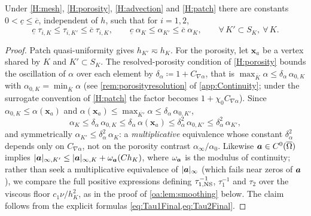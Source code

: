 \begin{lemma}
\label{oa:lem:patch}
Under \cref{H:mesh}, \cref{H:porosity}, \cref{H:advection} and \cref{H:patch} there are constants
$0 < \underline{c} \le \overline{c}$, independent of $h$, such that for $i = 1,2$,
\begin{equation}
  \label{oa:eq:PatchEquivalence}
  \underline{c}\;\tau_{i,K} \le \tau_{i,K'} \le \overline{c}\;\tau_{i,K},
  \qquad
  \underline{c}\;\alpha_{K} \le \alpha_{K'} \le \overline{c}\;\alpha_{K},
  \qquad \forall\, K' \subset S_K,\ \forall\, K.
\end{equation}
\end{lemma}

\begin{proof}
Patch quasi-uniformity gives $h_{K'} \eqsim h_K$. For the porosity, let $\boldsymbol{x}_a$ be a
vertex shared by $K$ and $K' \subset S_K$. The resolved{\hyp}porosity condition of \cref{H:porosity}
bounds the oscillation of $\alpha$ over each element by $\delta_\alpha \coloneqq 1 + C_{\nabla\alpha}$,
that is $\max_{\overline{K}}\alpha \le \delta_\alpha\,\alpha_{0,K}$ with
$\alpha_{0,K}=\min_{\overline{K}}\alpha$ (see \cref{rem:porosityresolution} of
\cref{app:Continuity}; under the surrogate convention of \cref{H:patch} the factor becomes
$1+\chi_0 C_{\nabla\alpha}$).
Since $\alpha_{0,K}\le\alpha(\boldsymbol{x}_a)$ and $\alpha(\boldsymbol{x}_a)\le\max_{\overline{K'}}\alpha\le\delta_\alpha\,\alpha_{0,K'}$,
\begin{equation*}
  \alpha_K \le \delta_\alpha\,\alpha_{0,K} \le \delta_\alpha\,\alpha(\boldsymbol{x}_a)
  \le \delta_\alpha^{2}\,\alpha_{0,K'} \le \delta_\alpha^{2}\,\alpha_{K'},
\end{equation*}
and symmetrically $\alpha_{K'}\le\delta_\alpha^{2}\,\alpha_K$: a \emph{multiplicative} equivalence whose
constant $\delta_\alpha^{2}$ depends only on $C_{\nabla\alpha}$, not on the porosity contrast
$\alpha_\infty/\alpha_0$. Likewise $\boldsymbol{a} \in C^0(\overline\Omega)$ implies $|\boldsymbol{a}|_{\infty,K'} \le
|\boldsymbol{a}|_{\infty,K} + \omega_{\boldsymbol{a}}(Ch_K)$, where $\omega_{\boldsymbol{a}}$ is the modulus of continuity; rather than
seek a multiplicative equivalence of $|\boldsymbol{a}|_\infty$ (which fails near zeros of $\boldsymbol{a}$), we compare the
full positive expressions defining $\tau_{1,\mathrm{NS}}^{-1}$, $\tau_1^{-1}$ and $\tau_2$ over the viscous floor
$c_1\nu/h_K^2$, as in the proof of \cref{oa:lem:smoothing} below. The claim follows from the explicit
formulas \cref{eq:Tau1Final,eq:Tau2Final}.
\end{proof}

